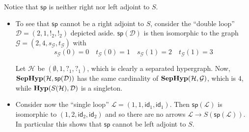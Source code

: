 \documentclass[3p]{elsarticle}
\newcommand{\catname}[1]{\textbf{\textup{#1}}}
\newcommand{\hyp}{\catname{Hyp}}
\newcommand{\shyp}{\catname{SepHyp}}
\renewcommand{\sp}{\mathsf{sp}}
\newcommand{\id}[1]{\mathsf{id}_{#1}}
\theoremstyle{remark}
\theoremstyle{definition}
\begin{document}
\noindent 
\begin{minipage}[l]{.68\linewidth}
\begin{rem}Notice that $\sp$ is neither right nor left adjoint to $S$.
	\begin{itemize}
		\item To see that $\sp$ cannot be a right adjoint to $S$, consider the ``double loop'' $\mathcal{D}=(2, 1, !_2, !_2)$ depicted aside. $\sp(\mathcal{D})$ is then isomorphic to the graph $\mathcal{G}=(2, 4, s_{\mathcal{G}}, t_{\mathcal{G}})$ with
		\[s_{\mathcal{G}}(0) = 0 \quad  t_{\mathcal{G}}(0) =  1 \quad  s_{\mathcal{G}}(1) = 2 \quad  t_{\mathcal{G}}(1) = 3 \]
		
		Let $\mathcal{H}$ be $(\emptyset, 1, ?_1, ?_1)$, which is clearly a separated hypergraph. Now,  $\shyp(\mathcal{H}, \sp(\mathcal{D}))$ has the same cardinality of  $\shyp(\mathcal{H}, \mathcal{G})$, which is $4$, while $\hyp(S(\mathcal{H}), \mathcal{D})$ is a singleton.
		\item Consider now the ``single loop'' $\mathcal{L}=(1, 1, \id{1}, \id{1})$. Then $\sp(\mathcal{L})$ is isomorphic to $(1, 2, \id{2}, \id{2})$ and so there are no arrows $\mathcal{L}\to S(\sp(\mathcal{L}))$. In particular this shows that $\sp$ cannot be left adjoint to $S$. 
	\end{itemize} 
\end{rem}
\end{minipage}
\hfill
\end{document}
